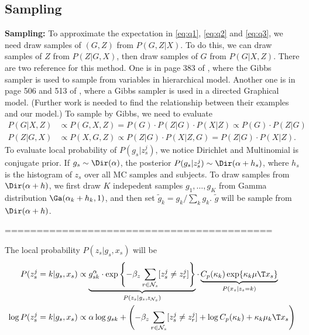 \documentclass{article}
\begin{document}
\subsection{Sampling}
\textbf{Sampling:} To approximate the expectation in \eqref{eq:q1}, \eqref{eq:q2} and \eqref{eq:q3}, we need draw samples of $(G, Z)$ from $P(G, Z|X)$. To do this, we can draw samples of $Z$ from $P(Z|G, X)$, then draw samples of $G$ from $P(G|X, Z)$. There are two reference for this method. One is in page 383 of \cite{robert2004monte}, where the Gibbs sampler is used to sample from variables in hierarchical model. Another one is in page 506 and 513 of \cite{koller2009probabilistic}, where a Gibbs sampler is used in a directed Graphical model. (Further work is needed to find the relationship between their examples and our model.) To sample by Gibbs,  we need to evaluate
\begin{align*}
  P(G|X, Z) &\propto P(G, X, Z) = P(G) \cdot P(Z|G) \cdot P(X|Z) \propto P(G) \cdot P(Z|G)\\
  P(Z|G, X) &\propto P(X, G, Z) \propto P(Z|G) \cdot P(X|Z, G) =  P(Z|G) \cdot P(X|Z).
\end{align*}
To evaluate local probability of $P(g_s | z_s^j)$, we notice Dirichlet and Multinomial is conjugate prior. If $g_s \sim  \Dir(\alpha)$, the posterior $P(g_s | z_s^j) \sim \Dir(\alpha + h_s)$, where $h_s $ is the histogram of $z_s$ over all MC samples and subjects. To draw samples from $\Dir(\alpha + h)$, we first draw $K$ indepedent samples $g_1, \dots, g_K$ from Gamma distribution $\Ga(\alpha_k + h_k, 1)$, and then set $\tilde g_k = g_k / \sum_k g_k$. $\tilde g$ will be sample from $\Dir(\alpha +h)$.



==========================================

The local probability $P(z_s | g_s, x_s)$ will be
\begin{align}
  P(z_s^j = k| g_s, x_s) &\propto \underbrace{ g_{sk}^{\alpha} \cdot \exp \left \{ - \beta_z \sum_{r \in \mathcal{N}_s} [ z_s^j \neq z_r^j] \right \} }_{P(z_s | g_s, z_{\mathcal{N}_s}) } \cdot \underbrace{ C_p(\kappa_k) \exp \{ \kappa_k \mu\T x_s \} }_{P(x_s | z_s = k)} \\
  \log   P(z_s^j = k| g_s, x_s) &\propto \alpha \log g_{sk} + \left ( - \beta_z \sum_{r \in \mathcal{N}_s} [ z_s^j \neq z_r^j] + \log C_p(\kappa_k) + \kappa_k \mu_k\T x_s\right ) \label{eq:condz}
\end{align}
\end{document}
